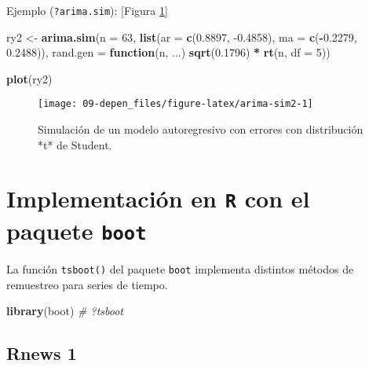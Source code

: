 \documentclass[
]{book}
\newenvironment{Shaded}{\begin{snugshade}}{\end{snugshade}}
\newcommand{\CommentTok}[1]{\textcolor[rgb]{0.56,0.35,0.01}{\textit{#1}}}
\newcommand{\ControlFlowTok}[1]{\textcolor[rgb]{0.13,0.29,0.53}{\textbf{#1}}}
\newcommand{\DataTypeTok}[1]{\textcolor[rgb]{0.13,0.29,0.53}{#1}}
\newcommand{\DecValTok}[1]{\textcolor[rgb]{0.00,0.00,0.81}{#1}}
\newcommand{\FloatTok}[1]{\textcolor[rgb]{0.00,0.00,0.81}{#1}}
\newcommand{\KeywordTok}[1]{\textcolor[rgb]{0.13,0.29,0.53}{\textbf{#1}}}
\newcommand{\NormalTok}[1]{#1}
\newcommand{\OperatorTok}[1]{\textcolor[rgb]{0.81,0.36,0.00}{\textbf{#1}}}
\newcommand{\StringTok}[1]{\textcolor[rgb]{0.31,0.60,0.02}{#1}}
\theoremstyle{break}
\theoremstyle{definition}
\theoremstyle{definition}
\theoremstyle{definition}
\theoremstyle{remark}
\begin{document}
Ejemplo (\texttt{?arima.sim}):
{[}Figura \ref{fig:arima-sim2}{]}

\begin{Shaded}
\begin{Highlighting}[]
\NormalTok{ry2 <-}\StringTok{ }\KeywordTok{arima.sim}\NormalTok{(}\DataTypeTok{n =} \DecValTok{63}\NormalTok{, }\KeywordTok{list}\NormalTok{(}\DataTypeTok{ar =} \KeywordTok{c}\NormalTok{(}\FloatTok{0.8897}\NormalTok{, }\FloatTok{-0.4858}\NormalTok{), }
          \DataTypeTok{ma =} \KeywordTok{c}\NormalTok{(}\OperatorTok{-}\FloatTok{0.2279}\NormalTok{, }\FloatTok{0.2488}\NormalTok{)),}
          \DataTypeTok{rand.gen =} \ControlFlowTok{function}\NormalTok{(n, ...) }\KeywordTok{sqrt}\NormalTok{(}\FloatTok{0.1796}\NormalTok{) }\OperatorTok{*}\StringTok{ }\KeywordTok{rt}\NormalTok{(n, }\DataTypeTok{df =} \DecValTok{5}\NormalTok{))}

\KeywordTok{plot}\NormalTok{(ry2)}
\end{Highlighting}
\end{Shaded}

\begin{figure}[!htb]

{\centering \texttt{[image: 09-depen\_files/figure-latex/arima-sim2-1]} 

}

\caption{Simulación de un modelo autoregresivo con errores con distribución *t* de Student.}\label{fig:arima-sim2}
\end{figure}

\hypertarget{implementaciuxf3n-en-r-con-el-paquete-boot}{%
\section{\texorpdfstring{Implementación en \texttt{R} con el paquete \texttt{boot}}{Implementación en R con el paquete boot}}\label{implementaciuxf3n-en-r-con-el-paquete-boot}}

La función \texttt{tsboot()} del paquete \texttt{boot} implementa distintos métodos
de remuestreo para series de tiempo.

\begin{Shaded}
\begin{Highlighting}[]
\KeywordTok{library}\NormalTok{(boot)}
\CommentTok{# ?tsboot}
\end{Highlighting}
\end{Shaded}

\hypertarget{rnews-1}{%
\subsection{Rnews 1}\label{rnews-1}}
\end{document}
